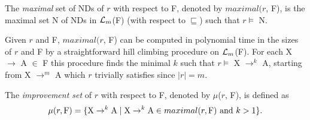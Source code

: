 \medskip

\begin{definition}
\begin{rm}
The {\em maximal} set of NDs of $r$ with respect to F,
denoted by $maximal(r$, F), is the maximal set N of NDs
in ${\cal L}_m$(F) (with respect to $\sqsubseteq$) such that $r \models$ N.
\end{rm}
\end{definition}
\medskip

Given $r$ and F, $maximal(r$, F) can be computed in polynomial time in the
sizes of $r$ and F by a straightforward hill climbing procedure
on ${\cal L}_m$(F). For each X $\to$ A $\in$ F this procedure finds 
the minimal $k$ such that $r \models$ X $\to^k$ A, starting 
from X $\to^m$ A which $r$ trivially satisfies since $\mid r \mid = m$. 


\begin{definition}
\begin{rm}
The {\em improvement set} of $r$ with respect to F, 
denoted by $\mu$($r$, F), is defined as 
\begin{displaymath}
\mu(r, {\rm F}) = \{{\rm X} \to^k {\rm A} \mid 
{\rm X} \to^k {\rm A} \in maximal(r, {\rm F}) \mbox{ and }  k > 1\}.
\end{displaymath}
\end{rm}
\end{definition}
\medskip


{\renewcommand{\baselinestretch}{1}
\begin{figure}[ht]
\begin{center}
\end{center}
\end{figure}
}


